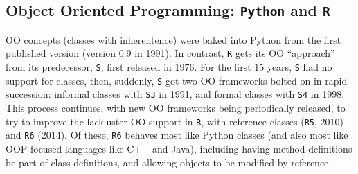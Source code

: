 \documentclass[12pt, krantz2,]{krantz}
\theoremstyle{definition}
\theoremstyle{definition}
\theoremstyle{definition}
\newcommand{\1}{\mathbbm{1}}
\begin{document}
\hypertarget{object-oriented-programming-python-and-r}{%
\subsection{\texorpdfstring{Object Oriented Programming: \texttt{Python} and \texttt{R}}{Object Oriented Programming: Python and R}}\label{object-oriented-programming-python-and-r}}

OO concepts (classes with inherentence) were baked into Python from the first
published version (version 0.9 in 1991). In contrast, \texttt{R} gets its OO ``approach''
from its predecessor, \texttt{S}, first released in 1976. For the first 15 years, \texttt{S}
had no support for classes, then, suddenly, \texttt{S} got two OO frameworks bolted on
in rapid succession: informal classes with \texttt{S3} in 1991, and formal classes with
\texttt{S4} in 1998. This process continues, with new OO frameworks being periodically
released, to try to improve the lackluster OO support in \texttt{R}, with reference
classes (\texttt{R5}, 2010) and \texttt{R6} (2014). Of these, \texttt{R6} behaves most like Python
classes (and also most like OOP focused languages like C++ and Java), including
having method definitions be part of class definitions, and allowing objects to
be modified by reference.



\backmatter
\printindex
\end{document}
